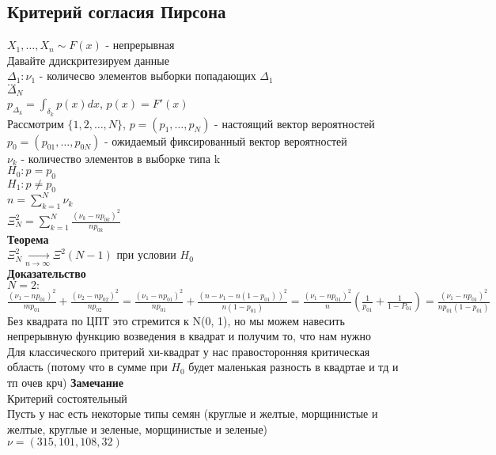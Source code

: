 \documentclass{article}
\newcommand\0{\mathbb{0}}
\newcommand\1{\mathbb{1}}
\newcommand{\xrto}{\xrightarrow}
\begin{document}
\subsection{Критерий согласия Пирсона}
$X_1, \dots, X_n \sim F(x)$ - непрерывная\\
Давайте ддискритезируем данные\\
$\Delta_1: \nu_1$ - количесво элементов выборки попадающих $\Delta_1$\\
$\dots$\\
$\Delta_N$\\
$p_{\Delta_k} = \displaystyle\int_{\delta_k} p(x) dx$, $p(x) = F'(x)$\\
Рассмотрим $\{1, 2, \dots, N\}$, $p = (p_1, \dots, p_N)$ - настоящий вектор вероятностей\\
$p_0 = (p_{01}, \dots, p_{0N})$ - ожидаемый фиксированный вектор вероятностей\\
$\nu_k$ - количество элементов в выборке типа k\\
$H_0: p = p_0$\\
$H_1: p \neq p_0$\\
$n = \displaystyle\sum_{k = 1}^N \nu_k$\\
$\Xi_N^2 = \displaystyle\sum_{k = 1}^N \frac{(\nu_k - np_{0k})^2}{np_{0k}}$\\
\textbf{Теорема}\\
$\Xi_N^2 \xrto[n \to \infty]{} \Xi^2(N - 1)$ при условии $H_0$\\
\textbf{Доказательство}\\
$N = 2:$\\
$\frac{(\nu_1 - np_{01})^2}{mp_{01}} + \frac{(\nu_2 - np_{02})^2}{np_{02}} = \frac{(\nu_1 - np_{01})^2}{np_{01}} + \frac{(n - \nu_1 - n(1 - p_{01}))^2}{n(1 - p_{01})} = \frac{(\nu_1 - np_{01})^2}{n}(\frac{1}{p_{01}} + \frac{1}{1 - P_{01}}) = \frac{(\nu_1 - np_{01})^2}{np_{01}(1 - p_{01})}$\\
Без квадрата по ЦПТ это стремится к N(0, 1), но мы можем навесить непрерывную функцию возведения в квадрат и получим то, что нам нужно\\
Для классического притерий хи-квадрат у нас правосторонняя критическая область (потому что в сумме при $H_0$ будет маленькая разность в квадртае и тд и тп очев крч)
\textbf{Замечание}\\
Критерий состоятельный\\
Пусть у нас есть некоторые типы семян (круглые и желтые, морщинистые и желтые, круглые и зеленые, морщинистые и зеленые)\\
$\nu = (315, 101, 108, 32)$\\
\end{document}
